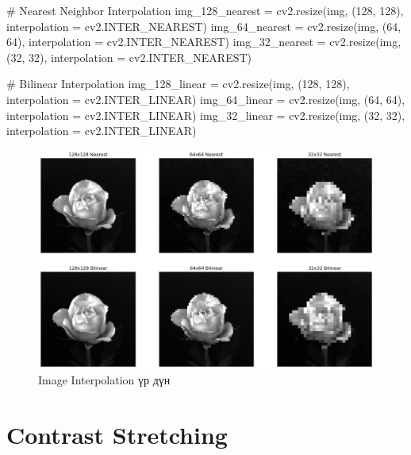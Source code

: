 \documentclass[a4paper]{article}
\begin{document}
\begin{python}
# Nearest Neighbor Interpolation
img_128_nearest = cv2.resize(img, (128, 128), 
                             interpolation = cv2.INTER_NEAREST)
img_64_nearest = cv2.resize(img, (64, 64), 
                            interpolation = cv2.INTER_NEAREST)
img_32_nearest = cv2.resize(img, (32, 32), 
                            interpolation = cv2.INTER_NEAREST)

# Bilinear Interpolation
img_128_linear = cv2.resize(img, (128, 128), 
                            interpolation = cv2.INTER_LINEAR)
img_64_linear = cv2.resize(img, (64, 64), 
                           interpolation = cv2.INTER_LINEAR)
img_32_linear = cv2.resize(img, (32, 32), 
                           interpolation = cv2.INTER_LINEAR)
\end{python}

\begin{figure}[H]
  \centering
  \includegraphics[scale = 0.35]{interpolation.png}
  \caption[Wider Face]{Image Interpolation үр дүн}
\end{figure}
\section{Contrast Stretching}
\end{document}
